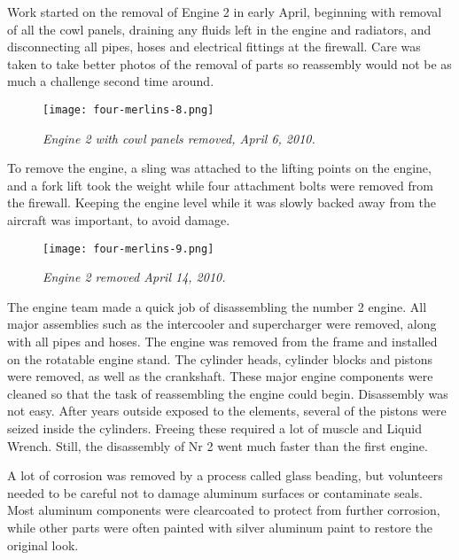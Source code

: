 Work started on the removal of Engine 2 in early April, beginning with removal
of all the cowl panels, draining any fluids left in the engine and radiators,
and disconnecting all pipes, hoses and electrical fittings at the firewall. 
Care was taken to take better photos of the removal of parts so reassembly
would not be as much a challenge second time around.

\begin{figure}[htbp]
   \vspace{2em}
   \centering
   \texttt{[image: four-merlins-8.png]}
   \caption*{\small \em Engine 2 with cowl panels removed, April 6, 2010.}
   \label{fig:tim}
\end{figure}

To remove the engine, a sling was attached to the lifting points on the engine,
and a fork lift took the weight while four attachment bolts were removed from
the firewall.  Keeping the engine level while it was slowly backed away from
the aircraft was important, to avoid damage.

\begin{figure}[htbp]
   \vspace{2em}
   \centering
   \texttt{[image: four-merlins-9.png]}
   \caption*{\small \em Engine 2 removed April 14, 2010.}
   \label{fig:tim}
\end{figure}

The engine team made a quick job of disassembling the number 2 engine.  All
major assemblies such as the intercooler and supercharger were removed, along
with all pipes and hoses.  The engine was removed from the frame and installed
on the rotatable engine stand.  The cylinder heads, cylinder blocks and pistons
were removed, as well as the crankshaft.  These major engine components were
cleaned so that the task of reassembling the engine could begin.  Disassembly
was not easy.  After years outside exposed to the elements, several of the
pistons were seized inside the cylinders.  Freeing these required a lot of
muscle and Liquid Wrench.  Still, the disassembly of Nr 2 went much faster than
the first engine.

A lot of corrosion was removed by a process called glass beading, but
volunteers needed to be careful not to damage aluminum surfaces or contaminate
seals.  Most aluminum components were clearcoated to protect from further
corrosion, while other parts were often painted with silver aluminum paint to
restore the original look.

